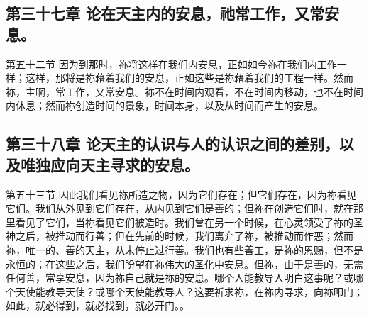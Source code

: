 
\subsection{第三十七章 论在天主内的安息，祂常工作，又常安息。}

第五十二节 因为到那时，祢将这样在我们内安息，正如如今祢在我们内工作一样；这样，那将是祢藉着我们的安息，正如这些是祢藉着我们的工程一样。然而祢，主啊，常工作，又常安息。祢不在时间内观看，不在时间内移动，也不在时间内休息；然而祢创造时间的景象，时间本身，以及从时间而产生的安息。\par


\subsection{第三十八章 论天主的认识与人的认识之间的差别，以及唯独应向天主寻求的安息。}

第五十三节 因此我们看见祢所造之物，因为它们存在；但它们存在，因为祢看见它们。我们从外见到它们存在，从内见到它们是善的；但祢在创造它们时，就在那里看见了它们，当祢看见它们被造时。我们曾在另一个时候，在心灵领受了祢的圣神之后，被推动而行善；但在先前的时候，我们离弃了祢，被推动而作恶；然而祢，唯一的、善的天主，从未停止过行善。我们也有些善工，是祢的恩赐，但不是永恒的；在这些之后，我们盼望在祢伟大的圣化中安息。但祢，由于是善的，无需任何善，常享安息，因为祢自己就是祢的安息。哪个人能教导人明白这事呢？或哪个天使能教导天使？或哪个天使能教导人？这要祈求祢，在祢内寻求，向祢叩门；如此，就必得到，就必找到，就必开门。。\par

